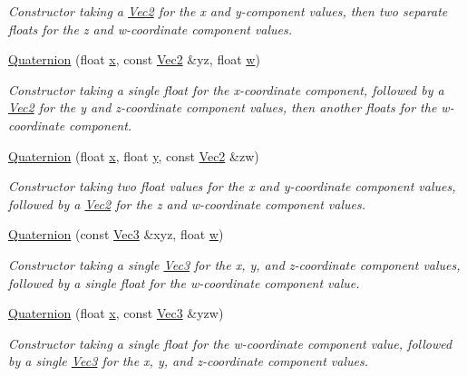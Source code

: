 \begin{DoxyCompactItemize}
\begin{DoxyCompactList}\small\item\em Constructor taking a \hyperlink{classgfxmath_1_1_vec2}{Vec2} for the x and y-\/component values, then two separate floats for the z and w-\/coordinate component values. \end{DoxyCompactList}\item 
\hyperlink{classgfxmath_1_1_quaternion_a3c3a835a39e53ccdccd9b5cce341f379}{Quaternion} (float \hyperlink{classgfxmath_1_1_vec4_a273598aff75406f0e7a47121b8b06037}{x}, const \hyperlink{classgfxmath_1_1_vec2}{Vec2} \&yz, float \hyperlink{classgfxmath_1_1_vec4_adf2769a47b464dfee8d04e191f21701e}{w})
\begin{DoxyCompactList}\small\item\em Constructor taking a single float for the x-\/coordinate component, followed by a \hyperlink{classgfxmath_1_1_vec2}{Vec2} for the y and z-\/coordinate component values, then another floats for the w-\/coordinate component. \end{DoxyCompactList}\item 
\hyperlink{classgfxmath_1_1_quaternion_ae3fb1cfeffa2dfe7e5f798d79148eb99}{Quaternion} (float \hyperlink{classgfxmath_1_1_vec4_a273598aff75406f0e7a47121b8b06037}{x}, float \hyperlink{classgfxmath_1_1_vec4_a95e0ca27d66d7e0223606c20d326b595}{y}, const \hyperlink{classgfxmath_1_1_vec2}{Vec2} \&zw)
\begin{DoxyCompactList}\small\item\em Constructor taking two float values for the x and y-\/coordinate component values, followed by a \hyperlink{classgfxmath_1_1_vec2}{Vec2} for the z and w-\/coordinate component values. \end{DoxyCompactList}\item 
\hyperlink{classgfxmath_1_1_quaternion_a86f8a453d076124dc9d19f7e8ab9f045}{Quaternion} (const \hyperlink{classgfxmath_1_1_vec3}{Vec3} \&xyz, float \hyperlink{classgfxmath_1_1_vec4_adf2769a47b464dfee8d04e191f21701e}{w})
\begin{DoxyCompactList}\small\item\em Constructor taking a single \hyperlink{classgfxmath_1_1_vec3}{Vec3} for the x, y, and z-\/coordinate component values, followed by a single float for the w-\/coordinate component value. \end{DoxyCompactList}\item 
\hyperlink{classgfxmath_1_1_quaternion_aa91bb97300aa0a6058f0e7ebb52c04db}{Quaternion} (float \hyperlink{classgfxmath_1_1_vec4_a273598aff75406f0e7a47121b8b06037}{x}, const \hyperlink{classgfxmath_1_1_vec3}{Vec3} \&yzw)
\begin{DoxyCompactList}\small\item\em Constructor taking a single float for the w-\/coordinate component value, followed by a single \hyperlink{classgfxmath_1_1_vec3}{Vec3} for the x, y, and z-\/coordinate component values. \end{DoxyCompactList}\end{DoxyCompactItemize}
